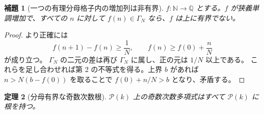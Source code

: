 \documentclass[11pt,uplatex,dvipdfmx]{jsarticle}
\newcommand{\Puiseux}{\mathcal P(k)}
\theoremstyle{proofnote}
\newtheorem{theorem}{定理}[section]
\newtheorem{lemma}[theorem]{補題}
\begin{document}
\begin{lemma}[一つの有理分母格子内の増加列は非有界]
\label{lem:lattice-chain}
  \(f:\mathbb N\to\mathbb Q\) とする。\(f\) が狭義単調増加で、すべての \(n\) に対して
  \(f(n)\in\Gamma_N\) なら、\(f\) は上に有界でない。
\end{lemma}
\begin{proof}
  より正確には
  \[
    f(n+1)-f(n)\ge\frac1N,\qquad
    f(n)\ge f(0)+\frac nN
  \]
  が成り立つ。
  \(\Gamma_N\) の二元の差は再び \(\Gamma_N\) に属し、正の元は \(1/N\) 以上である。
  これらを足し合わせれば第 2 の不等式を得る。上界 \(b\) があれば
  \(n>N(b-f(0))\) を取ることで \(f(0)+n/N>b\) となり、矛盾する。
\end{proof}

\begin{theorem}[分母有界な奇数次数根]
\label{thm:puiseux-odd-roots}
  \(\Puiseux\) 上の奇数次数多項式はすべて \(\Puiseux\) に根を持つ。
\end{theorem}
\end{document}
